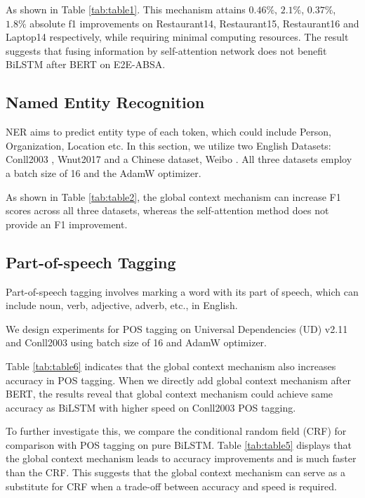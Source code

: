 \documentclass[lettersize,journal]{IEEEtran}
\begin{document}
As shown in Table \ref{tab:table1}. This mechanism attains $0.46\%$, $2.1\%$, $0.37\%$, $1.8\%$ absolute f1 improvements on Restaurant14, Restaurant15, Restaurant16 and Laptop14 respectively, while requiring minimal computing resources. The result suggests that fusing information by self-attention network does not benefit BiLSTM after BERT on E2E-ABSA.

\subsection{Named Entity Recognition} 
NER aims to predict entity type of each token, which could include Person, Organization, Location etc. In this section, we utilize two English Datasets: Conll2003 \cite{Sang2003}, Wnut2017 \cite{Derczynski2017} and a Chinese dataset, Weibo \cite{Peng2015}. All three datasets employ a batch size of 16 and the AdamW optimizer.


As shown in Table \ref{tab:table2}, the global context mechanism can increase F1 scores across all three datasets, whereas the self-attention method does not provide an F1 improvement.

\subsection{Part-of-speech Tagging}
Part-of-speech tagging involves marking a word with its part of speech, which can include noun, verb, adjective, adverb, etc., in English.

We design experiments for POS tagging on Universal Dependencies (UD) v2.11 \cite{Silveira2014} and Conll2003 using batch size of 16 and AdamW optimizer.

Table \ref{tab:table6} indicates that the global context mechanism also increases accuracy in POS tagging. When we directly add global context mechanism after BERT, the results reveal that global context mechanism could achieve same accuracy as BiLSTM with higher speed on Conll2003 POS tagging. 

To further investigate this, we compare the conditional random field (CRF) for comparison with POS tagging on pure BiLSTM. Table \ref{tab:table5} displays that the global context mechanism leads to accuracy improvements and is much faster than the CRF. This suggests that the global context mechanism can serve as a substitute for CRF when a trade-off between accuracy and speed is required.
\end{document}
